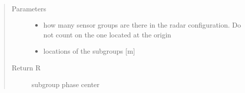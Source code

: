 \documentclass[letterpaper,10pt,english]{sphinxmanual}
\begin{document}
\begin{fulllineitems}
\label{\detokenize{functions:functions.R_cal}}~\begin{quote}\begin{description}
\item[{Parameters}] \leavevmode\begin{itemize}
\item {} 
 \textendash{} how many sensor groups are there in the radar configuration. Do not count on the one located     at the origin

\item {} 
 \textendash{} locations of the subgroups {[}m{]}

\end{itemize}

\item[{Return R}] \leavevmode
subgroup phase center

\end{description}\end{quote}

\end{fulllineitems}

\end{document}
